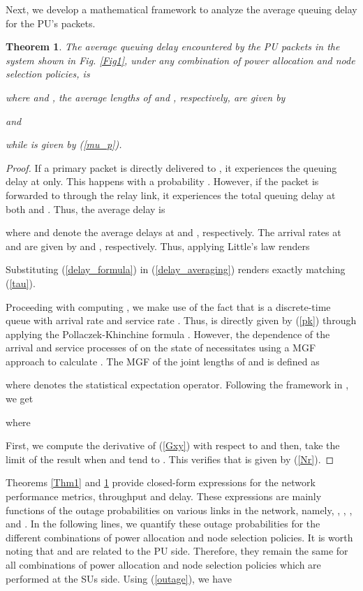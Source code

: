 \documentclass[journal,twocolumn]{IEEEtran}
\newtheorem{theorem}{Theorem}
\begin{document}
Next, we develop a mathematical framework to analyze the average queuing delay for the PU's packets.

\begin{theorem}\label{Thm2}
The average queuing delay encountered by the PU packets in the system shown in Fig. \ref{Fig1}, under any combination of power
allocation and node selection policies, is

where  and , the average lengths of  and , respectively, are given by

and

while  is given by (\ref{mu_p}).
\end{theorem}
\begin{proof}
If a primary packet is directly delivered to , it experiences the queuing delay at  only.
This happens with a probability . However, if the packet is forwarded to  through the relay link, it experiences the total queuing delay at both  and . Thus, the average delay is

where  and  denote the average delays at  and , respectively.
The arrival rates at  and  are given by  and , respectively. Thus, applying Little's law
\cite{Bertsekas} renders

Substituting (\ref{delay_formula}) in (\ref{delay_averaging}) renders  exactly matching (\ref{tau}).

Proceeding with computing , we make use of the fact that  is a discrete-time  queue with arrival rate  and
service rate . Thus,  is directly given by (\ref{pk}) through applying the Pollaczek-Khinchine formula \cite{PK}. However, the
dependence of the arrival and service processes of  on the state of  necessitates using a MGF approach \cite{sidi} to calculate
. The MGF of the joint lengths of  and  is defined as

where  denotes the statistical expectation operator. Following the framework in \cite{Ephremedis,ashour2015cognitive}, we get

where

First, we compute the derivative of (\ref{Gxy}) with respect to  and then, take the limit of the result
when  and  tend to . This verifies that  is given by (\ref{Nr}).
\end{proof}

Theorems \ref{Thm1} and \ref{Thm2} provide closed-form expressions for the network performance metrics, throughput and delay. These expressions are mainly functions of the outage probabilities on various links in the network, namely, , , , and . In the following lines, we quantify these outage probabilities for the different combinations of power allocation and node selection policies. It is worth noting that  and  are related to the PU side. Therefore, they remain the same for all combinations of power allocation and node selection policies which are performed at the SUs side. Using (\ref{outage}), we have
\end{document}
